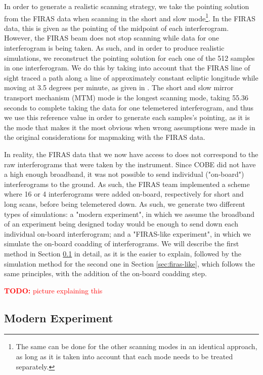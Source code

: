\documentclass{aa}
\newcommand{\todo}[1]{\textcolor{red}{\textbf{TODO:} #1}}
\begin{document}
In order to generate a realistic scanning strategy, we take the pointing solution from the FIRAS data when scanning in the short and slow mode\footnote{The same can be done for the other scanning modes in an identical approach, as long as it is taken into account that each mode needs to be treated separately.}. In the FIRAS data, this is given as the pointing of the midpoint of each interferogram. However, the FIRAS beam does not stop scanning while data for one interferogram is being taken. As such, and in order to produce realistic simulations, we reconstruct the pointing solution for each one of the 512 samples in one interferogram. We do this by taking into account that the FIRAS line of sight traced a path along a line of approximately constant ecliptic longitude while moving at 3.5 degrees per minute, as given in \cite{firasexsupp}. The short and slow mirror transport mechanism (MTM) mode is the longest scanning mode, taking 55.36 seconds to complete taking the data for one telemetered interferogram, and thus we use this reference value in order to generate each samples's pointing, as it is the mode that makes it the most obvious when wrong assumptions were made in the original considerations for mapmaking with the FIRAS data. 

In reality, the FIRAS data that we now have access to does not correspond to the raw interferograms that were taken by the instrument. Since COBE did not have a high enough broadband, it was not possible to send individual ("on-board") interferograms to the ground. As such, the FIRAS team implemented a scheme where 16 or 4 interferograms were added on-board, respectively for short and long scans, before being telemetered down. As such, we generate two different types of simulations: a "modern experiment", in which we assume the broadband of an experiment being designed today would be enough to send down each individual on-board interferogram; and a "FIRAS-like experiment", in which we simulate the on-board coadding of interferograms. We will describe the first method in Section \ref{sec:modern} in detail, as it is the easier to explain, followed by the simulation method for the second one in Section \ref{sec:firas-like}, which follows the same principles, with the addition of the on-board coadding step.

\todo{picture explaining this}

\subsection{Modern Experiment}
\label{sec:modern}
\end{document}
